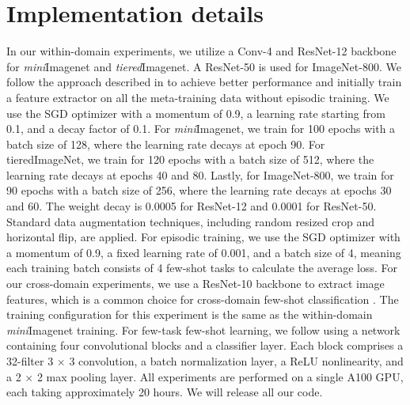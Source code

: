 \section{Implementation details}
In our within-domain experiments, we utilize a Conv-4 and ResNet-12 backbone for \textit{mini}Imagenet and \textit{tiered}Imagenet. A ResNet-50 is used for ImageNet-800. We follow the approach described in \cite{chen2021meta} to achieve better performance and initially train a feature extractor on all the meta-training data without episodic training. We use the SGD optimizer with a momentum of 0.9, a learning rate starting from 0.1, and a decay factor of 0.1. For \textit{mini}Imagenet, we train for 100 epochs with a batch size of 128, where the learning rate decays at epoch 90. For tieredImageNet, we train for 120 epochs with a batch size of 512, where the learning rate decays at epochs 40 and 80. Lastly, for ImageNet-800, we train for 90 epochs with a batch size of 256, where the learning rate decays at epochs 30 and 60. The weight decay is 0.0005 for ResNet-12 and 0.0001 for  ResNet-50. Standard data augmentation techniques, including random resized crop and horizontal flip, are applied. For episodic training, we use the SGD optimizer with a momentum of 0.9, a fixed learning rate of 0.001, and a batch size of 4, meaning each training batch consists of 4 few-shot tasks to calculate the average loss.
%
For our cross-domain experiments, we use a ResNet-10 backbone to extract image features, which is a common choice for cross-domain few-shot classification \cite{guo2020broader, ye20}. The training configuration for this experiment is the same as the within-domain \textit{mini}Imagenet training. 
%
For few-task few-shot learning, we follow \cite{yao2021meta} using a network containing four convolutional blocks and a classifier layer. Each block comprises a 32-filter 3 {$\times$} 3 convolution, a batch normalization layer, a ReLU nonlinearity, and a 2 {$\times$} 2 max pooling layer.
All experiments are performed on a single A100 GPU, each taking approximately 20 hours.
We will release all our code.



